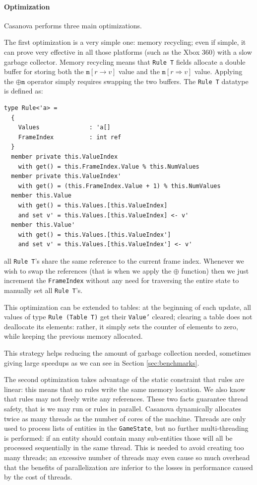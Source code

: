 \paragraph{Optimization}

Casanova performs three main optimizations.

The first optimization is a very simple one: memory recycling; even if simple, it can prove very effective in all those platforms (such as the Xbox 360) with a slow garbage collector. Memory recycling means that \texttt{Rule T} fields allocate a double buffer for storing both the $\mathtt{m}[r \rightarrow v]$ value and the $\mathtt{m}[r \Rightarrow v]$ value. Applying the $\oplus \mathtt{m}$ operator simply requires swapping the two buffers. The \texttt{Rule T} datatype is defined as:

\begin{lstlisting}
type Rule<'a> =
  {
    Values              : 'a[]
    FrameIndex          : int ref
  }
  member private this.ValueIndex
    with get() = this.FrameIndex.Value % this.NumValues
  member private this.ValueIndex' 
    with get() = (this.FrameIndex.Value + 1) % this.NumValues
  member this.Value
    with get() = this.Values.[this.ValueIndex]
    and set v' = this.Values.[this.ValueIndex] <- v'
  member this.Value'
    with get() = this.Values.[this.ValueIndex']
    and set v' = this.Values.[this.ValueIndex'] <- v'
\end{lstlisting}

all \texttt{Rule T}'s share the same reference to the current frame index. Whenever we wish to swap the references (that is when we apply the $\oplus$ function) then we just increment the \texttt{FrameIndex} without any need for traversing the entire state to manually set all \texttt{Rule T}'s.

This optimization can be extended to tables: at the beginning of each update, all values of type \texttt{Rule (Table T)} get their \texttt{Value'} cleared; clearing a table does not deallocate its elements: rather, it simply sets the counter of elements to zero, while keeping the previous memory allocated.

This strategy helps reducing the amount of garbage collection needed, sometimes giving large speedups as we can see in Section \ref{sec:benchmarks}.


The second optimization takes advantage of the static constraint that rules are linear: this means that no rules write the same memory location. We also know that rules may not freely write any references. These two facts guarantee thread safety, that is we may run or rules in parallel. Casanova dynamically allocates twice as many threads as the number of cores of the machine. Threads are only used to process lists of entities in the \texttt{GameState}, but no further multi-threading is performed: if an entity should contain many sub-entities those will all be processed sequentially in the same thread. This is needed to avoid creating too many threads; an excessive number of threads may even cause so much overhead that the benefits of parallelization are inferior to the losses in performance caused by the cost of threads.

